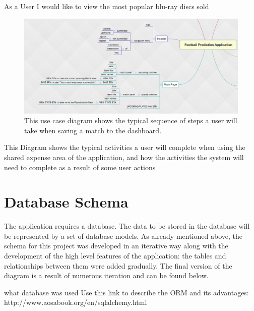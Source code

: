 As a User I would like to view the most popular blu-ray discs sold


\begin{figure}[H]
	\begin{center}
		\includegraphics[width=.90\textwidth]{design/images/mindmap}
		\caption{This use case diagram shows the typical sequence of steps a user will take when saving a match to the dashboard.} \label{fig:using:usecase1}
	\end{center}
\end{figure}
This Diagram shows the typical activities a user will complete when using the shared expense area of the application, and how the activities the system will need to complete as a result of some user actions

\section{Database Schema}
\label{databaseschema_prototype}
The application requires a database. The data to be stored in the database will be represented by a set of database models. As already mentioned above, the schema for this project was developed in an iterative way along with the development of the high level features of the application: the tables and relationships between them were added gradually. The final version of the diagram is a result of numerous iteration and can be found below.




what database was used
Use this link to describe the ORM and its advantages: 
http://www.aosabook.org/en/sqlalchemy.html

